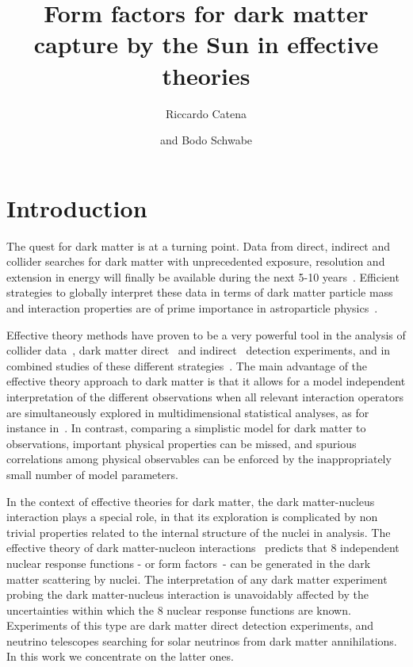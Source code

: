 \documentclass[11pt,a4paper]{article}
\title{Form factors for dark matter capture by the Sun in effective theories}
\author[a]{Riccardo Catena}
\author[a]{and Bodo Schwabe}
\affiliation[a]{Institut f\"ur Theoretische Physik, Friedrich-Hund-Platz 1, 37077 G\"ottingen, Germany}
\begin{document}
\maketitle

\section{Introduction}
The quest for dark matter is at a turning point. Data from direct, indirect and collider searches for dark matter with unprecedented exposure, resolution and extension in energy will finally be available during the next 5-10 years~\cite{Cakir:2014nba,Catena:2013pka,Ibarra:2012cc,Bergstrom:2012vd,Bringmann:2012ez,Baudis:2012ig,Bertone:2010at}. Efficient strategies to globally interpret these data in terms of dark matter particle mass and interaction properties are of prime importance in astroparticle physics~\cite{Strege:2014ija,Buchmueller:2013rsa,Bechtle:2012zk}. 

Effective theory methods have proven to be a very powerful tool in the analysis of collider data~\cite{Zhou:2013raa,Rajaraman:2011wf,Goodman:2010ku,Goodman:2010yf}, dark matter direct~\cite{Gluscevic:2014vga,Catena:2014uqa,Catena:2014epa,Catena:2014hla,Panci:2014gga,DelNobile:2013sia,Fitzpatrick:2012ib,Fornengo:2011sz,DelNobile:2011uf} and indirect~\cite{Chen:2013gya,Rajaraman:2012fu,Goodman:2010qn} detection experiments, and in combined studies of these different strategies~\cite{Fedderke:2014wda,Alves:2014yha,Alves:2015pea}. The main advantage of the effective theory approach to dark matter is that it allows for a model independent interpretation of the different observations when all relevant interaction operators are simultaneously explored in multidimensional statistical analyses, as for instance in~\cite{Catena:2014uqa,Catena:2014epa,Catena:2014hla}. In contrast, comparing a simplistic model for dark matter to observations, important physical properties can be missed, and spurious correlations among physical observables can be enforced by the inappropriately small number of model parameters.

In the context of effective theories for dark matter, the dark matter-nucleus interaction plays a special role, in that its exploration is complicated by non trivial properties related to the internal structure of the nuclei in analysis. The effective theory of dark matter-nucleon interactions~\cite{Fitzpatrick:2012ix,Fan:2010gt} predicts that 8 independent nuclear response functions - or form factors~- can be generated in the dark matter scattering by nuclei. The interpretation of any dark matter experiment probing the dark matter-nucleus interaction is unavoidably affected by the uncertainties within which the 8 nuclear response functions are known. Experiments of this type are dark matter direct detection experiments, and neutrino telescopes searching for solar neutrinos from dark matter annihilations. In this work we concentrate on the latter ones.
\end{document}
